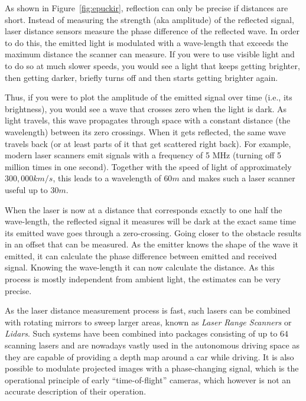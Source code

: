 As shown in Figure~\ref{fig:epuckir}, reflection can only be precise if distances are short. Instead of measuring the strength (aka amplitude) of the reflected signal, laser distance sensors measure the phase difference of the reflected wave. In order to do this, the emitted light is modulated with a wave-length that exceeds the maximum distance the scanner can measure.
If you were to use visible light and to do so at much slower speeds, you would see a light that keeps getting brighter, then getting darker, briefly turns off and then starts getting brighter again.

Thus, if you were to plot the amplitude of the emitted signal over time (i.e., its brightness), you would see a wave that crosses zero when the light is dark.
As light travels, this wave propagates through space with a constant distance (the wavelength) between its zero crossings. When it gets reflected, the same wave travels back (or at least parts of it that get scattered right back). For example, modern laser scanners emit signals with a frequency of 5 MHz (turning off 5 million times in one second). Together with the speed of light of approximately $300,000km/s$, this leads to a wavelength of $60m$ and makes such a laser scanner useful up to $30m$.

When the laser is now at a distance that corresponds exactly to one half the wave-length, the reflected signal it measures will be dark at the exact same time its emitted wave goes through a zero-crossing. Going closer to the obstacle results in an offset that can be measured. As the emitter knows the shape of the wave it emitted, it can calculate the phase difference between emitted and received signal. Knowing the wave-length it can now calculate the distance. As this process is mostly independent from ambient light, the estimates can be very precise.

As the laser distance measurement process is fast, such lasers can be combined with rotating mirrors to sweep larger areas, known as \textsl{Laser Range Scanners} or \textsl{Lidars}. Such systems have been combined into packages consisting of up to $64$ scanning lasers and are nowadays vastly used in the autonomous driving space as they are capable of providing a depth map around a car while driving.
It is also possible to modulate projected images with a phase-changing signal, which is the operational principle of early ``time-of-flight'' cameras, which however is not an accurate description of their operation.

